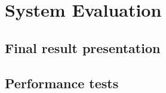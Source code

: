 \chapter{System Evaluation}\label{chap:eval}
\section{Final result presentation}\label{sec:result} 
\section{Performance tests}\label{sec:performance} 